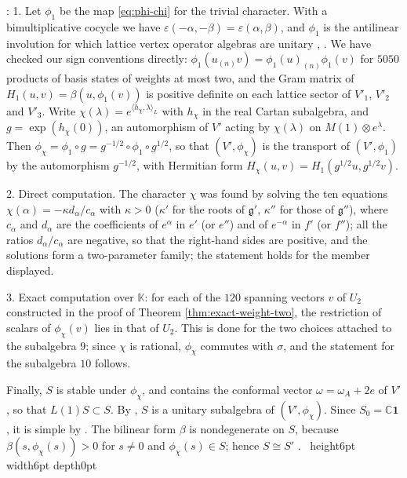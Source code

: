 \documentclass[leqno]{article}
\newcommand{\Cbb}{\ensuremath{\mathbb{C}}}
\newcommand{\K}{\ensuremath{\mathbb{K}}}
\newcommand{\qed}{\hfill \vrule height6pt  width6pt depth0pt}
\newcommand{\ot}{\otimes}
\newcommand{\epsi}{\varepsilon}
\newenvironment{proof}[1][]{\noindent {\it Proof #1} : }{\hbox{~}\qed
\smallskip
}
\numberwithin{equation}{section}
\begin{document}
\begin{proof}
1. Let $\phi_1$ be the map \eqref{eq:phi-chi} for the trivial character. With a bimultiplicative cocycle we have $\epsi(-\alpha,-\beta) = \epsi(\alpha,\beta)$, and $\phi_1$ is the antilinear involution for which lattice vertex operator algebras are unitary \cite[Theorem 4.12]{DoL14}, \cite[Example 5.9]{CKLW18}. We have checked our sign conventions directly: $\phi_1(u_{(n)}v) = \phi_1(u)_{(n)}\phi_1(v)$ for $5050$ products of basis states of weights at most two, and the Gram matrix of $H_1(u,v) = \beta(u,\phi_1(v))$ is positive definite on each lattice sector of $V'_1$, $V'_2$ and $V'_3$. Write $\chi(\lambda) = e^{\langle h_\chi,\lambda\rangle_L}$ with $h_\chi$ in the real Cartan subalgebra, and $g = \exp(h_\chi(0))$, an automorphism of $V'$ acting by $\chi(\lambda)$ on $M(1) \ot e^\lambda$. Then $\phi_\chi = \phi_1 \circ g = g^{-1/2} \circ \phi_1 \circ g^{1/2}$, so that $(V',\phi_\chi)$ is the transport of $(V',\phi_1)$ by the automorphism $g^{-1/2}$, with Hermitian form $H_\chi(u,v) = H_1(g^{1/2}u,g^{1/2}v)$.

2. Direct computation. The character $\chi$ was found by solving the ten equations $\chi(\alpha) = -\kappa d_\alpha/c_\alpha$ with $\kappa > 0$ ($\kappa'$ for the roots of $\mathfrak g'$, $\kappa''$ for those of $\mathfrak g''$), where $c_\alpha$ and $d_\alpha$ are the coefficients of $e^{\alpha}$ in $e'$ (or $e''$) and of $e^{-\alpha}$ in $f'$ (or $f''$); all the ratios $d_\alpha/c_\alpha$ are negative, so that the right-hand sides are positive, and the solutions form a two-parameter family; the statement holds for the member displayed.

3. Exact computation over $\K$: for each of the $120$ spanning vectors $v$ of $U_2$ constructed in the proof of Theorem \ref{thm:exact-weight-two}, the restriction of scalars of $\phi_\chi(v)$ lies in that of $U_2$. This is done for the two choices attached to the subalgebra $9$; since $\chi$ is rational, $\phi_\chi$ commutes with $\sigma$, and the statement for the subalgebra $10$ follows.

Finally, $S$ is stable under $\phi_\chi$, and contains the conformal vector $\omega = \omega_A + 2e$ of $V'$, so that $L(1)S \subset S$. By \cite[Proposition 5.23]{CKLW18}, $S$ is a unitary subalgebra of $(V',\phi_\chi)$. Since $S_0 = \Cbb\mathbf 1$, it is simple by \cite[Proposition 5.3]{CKLW18}. The bilinear form $\beta$ is nondegenerate on $S$, because $\beta(s,\phi_\chi(s)) > 0$ for $s \neq 0$ and $\phi_\chi(s) \in S$; hence $S \cong S'$ \cite{FHL93}.
\end{proof}
\end{document}

